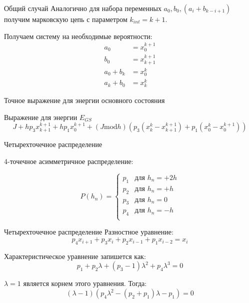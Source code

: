 \documentclass{beamer}
\begin{document}
\begin{frame}{Общий случай}
	Аналогично для набора переменных $a_0, b_0, (a_i + b_{k-i+1})$ получим марковскую цепь с параметром $k_{int} = k+1$.
	\begin{block}{Получаем систему на необходимые вероятности:}
		\begin{align*}
a_0 &= x^{k+1}_0\\
b_0 &= x^{k+1}_{k+1}\\
a_0 + b_{k} &= x^{k}_0\\
a_k + b_0 &= x^k_k
\end{align*}
	\end{block}
\end{frame}
\begin{frame}{Точное выражение для энергии основного состояния}
    \begin{block}{Выражение для энергии $E_{GS}$}
    \begin{equation*}
		J + h p_3 x^{k+1}_{k+1}  + h p_1 x^{k+1}_0 + (J \text{mod} h) (p_3 (x^k_k - x^{k+1}_{k+1}) +p_1(x^k_0-x^{k+1}_0))
    \end{equation*}
\end{block}
\end{frame}


\begin{frame}{Четырехточечное распределение}

\begin{block}{4-точечное асимметричное распределение:}

\begin{equation*}
P(h_n) =
\begin{cases}
p_1 &\mbox{для } h_n= +2h \\
p_2 &\mbox{для } h_n= +h \\
p_3 &\mbox{для } h_n= 0\\
p_4 &\mbox{для } h_n = -h\\
\end{cases}
\end{equation*}
\end{block}
\end{frame}

\begin{frame}{Четырехточечное распределение}
Разностное уравнение:
\begin{equation*}
	p_4 x_{i+1} + p_3 x_{i} + p_2 x_{i-1} +p_1 x_{i-2} = x_{i}
\end{equation*}

Характеристическое уравнение запишется как:
\begin{equation*}
	p_1+ p_2\lambda + (p_3-1) \lambda^2 + p_4 \lambda^3 = 0
\end{equation*}

$\lambda=1$ является корнем этого уравнения. Тогда:
\begin{equation*}
(\lambda - 1)(p_4 \lambda^2 - (p_2 + p_1)\lambda - p_1	) =0
\end{equation*}
    
\end{frame}
\end{document}
